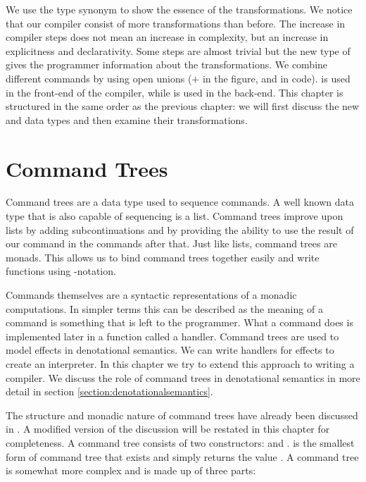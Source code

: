 We use the type synonym  to show the essence of the transformations. We notice that our compiler consist of more transformations than before. The increase in compiler steps does not mean an increase in complexity, but an increase in explicitness and declarativity. Some steps are almost trivial but the new type of  gives the programmer information about the transformations. We combine different commands by using open unions ($+$ in the figure, and \icode{:+:} in code).  is used in the front-end of the compiler, while  is used in the back-end. This chapter is structured in the same order as the previous chapter: we will first discuss the new  and  data types and then examine their transformations.

\section{\label{section:commandtree}Command Trees}
Command trees are a data type used to sequence commands. A well known data type that is also capable of sequencing is a list. Command trees improve upon lists by adding subcontinuations and by providing the ability to use the result of our command in the commands after that. Just like lists, command trees are monads. This allows us to bind command trees together easily and write functions using -notation.

Commands themselves are a syntactic representations of a monadic computations. In simpler terms this can be described as the meaning of a command is something that is left to the programmer. What a command does is implemented later in a function called a handler. Command trees are used to model effects in denotational semantics. We can write handlers for effects to create an interpreter. In this chapter we try to extend this approach to writing a compiler. We discuss the role of command trees in denotational semantics in more detail in section \ref{section:denotationalsemantics}.

The structure and monadic nature of command trees have already been discussed in  \autocite{commandtreespoulsen}. A modified version of the discussion will be restated in this chapter for completeness. A command tree consists of two constructors:  and .  is the smallest form of command tree that exists and simply returns the value . A  command tree is somewhat more complex and is made up of three parts:

